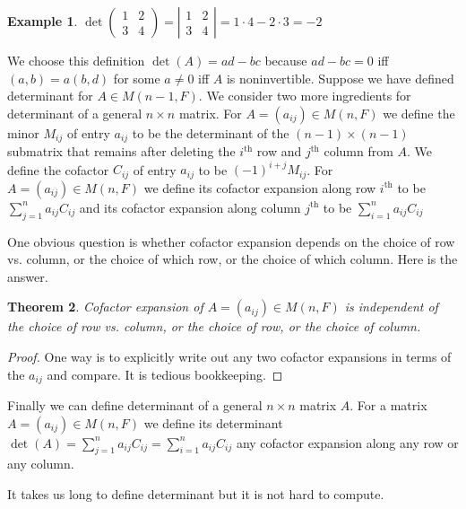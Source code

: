 \documentclass[12pt]{amsart}
\newtheorem{theorem}{Theorem}[section]
\theoremstyle{definition}
\newtheorem{example}[theorem]{Example}
\begin{document}
\begin{example} $\det\left(\begin{array}{cc} 1 & 2 \\ 3 & 4 \end{array}\right) = \left|\begin{array}{cc} 1 & 2 \\ 3 & 4 \end{array}\right| = 1 \cdot 4 - 2 \cdot 3 = -2$
\end{example}

We choose this definition $\det(A) = ad - bc$ because $ad-bc = 0$ iff $(a, b) = a (b, d)$ for some $a \neq 0$ iff $A$ is noninvertible. Suppose we have defined determinant for $A \in M(n-1, F)$. We consider two more ingredients for determinant of a general $n \times n$ matrix.
\dfn For $A = (a_{ij}) \in M(n, F)$ we define the minor $M_{ij}$ of entry $a_{ij}$ to be the determinant of the $(n-1) \times (n-1)$ submatrix that remains after deleting the $i^{\text{th}}$ row and $j^{\text{th}}$ column from $A$. We define the cofactor $C_{ij}$ of entry $a_{ij}$ to be $(-1)^{i + j}M_{ij}$.
\dfn For $A = (a_{ij}) \in M(n, F)$ we define its cofactor expansion along row $i^{\text{th}}$ to be $\sum\limits_{j = 1}^{n} a_{ij}C_{ij}$ and its cofactor expansion along column $j^{\text{th}}$ to be $\sum\limits_{i = 1}^{n} a_{ij}C_{ij}$

One obvious question is whether cofactor expansion depends on the choice of row vs. column, or the choice of which row, or the choice of which column. Here is the answer.

\begin{theorem} Cofactor expansion of $A = (a_{ij}) \in M(n, F)$ is independent of the choice of row vs. column, or the choice of row, or the choice of column.
\end{theorem}
\begin{proof} One way is to explicitly write out any two cofactor expansions in terms of the $a_{ij}$ and compare. It is tedious bookkeeping.
\end{proof}

Finally we can define determinant of a general $n \times n$ matrix $A$.
\dfn For a matrix $A = (a_{ij}) \in M(n, F)$ we define its determinant $\det(A) = \sum\limits_{j = 1}^{n} a_{ij}C_{ij} = \sum\limits_{i = 1}^{n} a_{ij}C_{ij}$ any cofactor expansion along any row or any column.

It takes us long to define determinant but it is not hard to compute.
\end{document}
